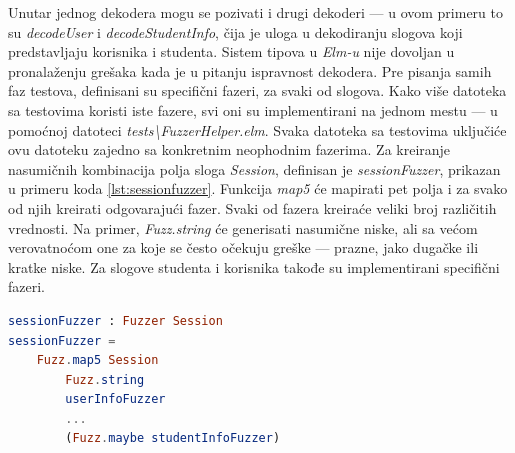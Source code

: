 \documentclass[12pt,oneside]{memoir}
\begin{document}
\vspace*{1\baselineskip}
\par Unutar jednog dekodera mogu se pozivati i drugi dekoderi --- u ovom primeru to su \emph{decodeUser} i \emph{decodeStudentInfo}, čija je uloga u dekodiranju slogova koji predstavljaju korisnika i studenta. Sistem tipova u \emph{Elm-u} nije dovoljan u pronalaženju grešaka kada je u pitanju ispravnost dekodera. Pre pisanja samih faz testova, definisani su specifični fazeri, za svaki od slogova. Kako više datoteka sa testovima koristi iste fazere, svi oni su implementirani na jednom mestu --- u pomoćnoj datoteci \emph{tests{\textbackslash}FuzzerHelper.elm}. Svaka datoteka sa testovima uključiće ovu datoteku zajedno sa konkretnim neophodnim fazerima. Za kreiranje nasumičnih kombinacija polja sloga \emph{Session}, definisan je \emph{sessionFuzzer}, prikazan u primeru koda \ref{lst:sessionfuzzer}. Funkcija \emph{map5} će mapirati pet polja i za svako od njih kreirati odgovarajući fazer. Svaki od fazera kreiraće veliki broj različitih vrednosti. Na primer, \emph{Fuzz.string} će generisati nasumične niske, ali sa većom verovatnoćom one za koje se često očekuju greške --- prazne, jako dugačke ili kratke niske. Za slogove studenta i korisnika takođe su implementirani specifični fazeri. 

\begin{minipage}{\linewidth}
\begin{lstlisting}[language=elm, basicstyle=\small, caption={Implementacija fazera za slog \emph{Session}},captionpos=b, label={lst:sessionfuzzer}]
sessionFuzzer : Fuzzer Session
sessionFuzzer = 
    Fuzz.map5 Session
        Fuzz.string
        userInfoFuzzer
        ...
        (Fuzz.maybe studentInfoFuzzer)
\end{lstlisting} 
\end{minipage}
\end{document}
